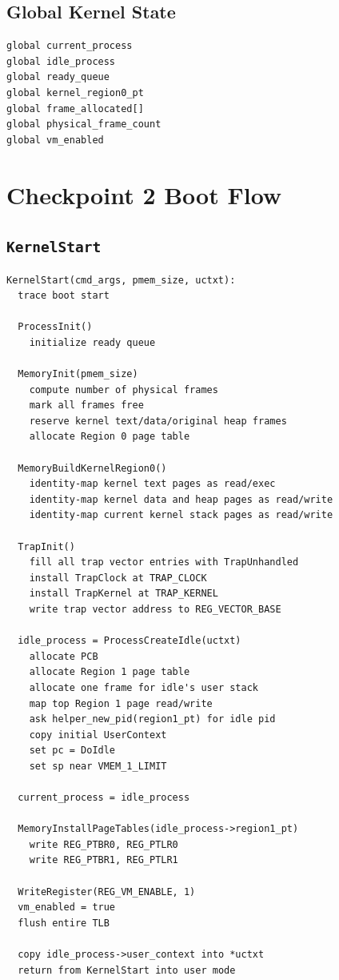\documentclass[11pt]{article}
\begin{document}
\subsection{Global Kernel State}

\begin{lstlisting}[style=yalnixpseudo]
global current_process
global idle_process
global ready_queue
global kernel_region0_pt
global frame_allocated[]
global physical_frame_count
global vm_enabled
\end{lstlisting}

\section{Checkpoint 2 Boot Flow}

\subsection{\texttt{KernelStart}}

\begin{lstlisting}[style=yalnixpseudo]
KernelStart(cmd_args, pmem_size, uctxt):
  trace boot start

  ProcessInit()
    initialize ready queue

  MemoryInit(pmem_size)
    compute number of physical frames
    mark all frames free
    reserve kernel text/data/original heap frames
    allocate Region 0 page table

  MemoryBuildKernelRegion0()
    identity-map kernel text pages as read/exec
    identity-map kernel data and heap pages as read/write
    identity-map current kernel stack pages as read/write

  TrapInit()
    fill all trap vector entries with TrapUnhandled
    install TrapClock at TRAP_CLOCK
    install TrapKernel at TRAP_KERNEL
    write trap vector address to REG_VECTOR_BASE

  idle_process = ProcessCreateIdle(uctxt)
    allocate PCB
    allocate Region 1 page table
    allocate one frame for idle's user stack
    map top Region 1 page read/write
    ask helper_new_pid(region1_pt) for idle pid
    copy initial UserContext
    set pc = DoIdle
    set sp near VMEM_1_LIMIT

  current_process = idle_process

  MemoryInstallPageTables(idle_process->region1_pt)
    write REG_PTBR0, REG_PTLR0
    write REG_PTBR1, REG_PTLR1

  WriteRegister(REG_VM_ENABLE, 1)
  vm_enabled = true
  flush entire TLB

  copy idle_process->user_context into *uctxt
  return from KernelStart into user mode
\end{lstlisting}
\end{document}
